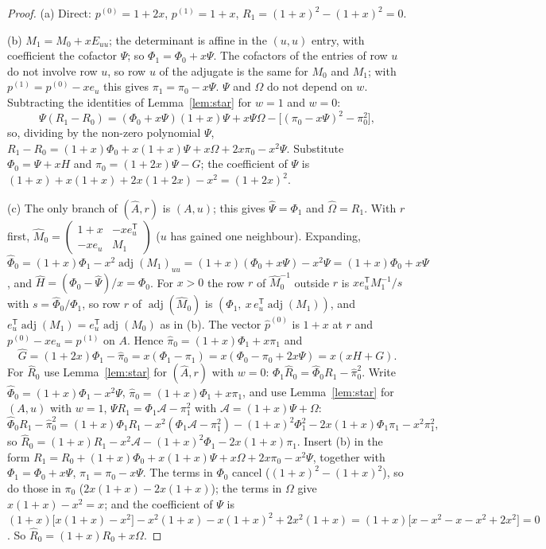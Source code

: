 \documentclass[11pt]{amsart}
\theoremstyle{definition}
\theoremstyle{remark}
\newcommand{\adj}{\operatorname{adj}}
\newcommand{\T}{\mathsf T}
\begin{document}
\begin{proof}
(a) Direct: $p^{(0)}=1+2x$, $p^{(1)}=1+x$, $R_1=(1+x)^2-(1+x)^2=0$.

(b) $M_1=M_0+xE_{uu}$; the determinant is affine in the $(u,u)$ entry, with
coefficient the cofactor $\Psi$; so $\Phi_1=\Phi_0+x\Psi$. The cofactors of
the entries of row $u$ do not involve row $u$, so row $u$ of the adjugate is
the same for $M_0$ and $M_1$; with $p^{(1)}=p^{(0)}-xe_u$ this gives
$\pi_1=\pi_0-x\Psi$. $\Psi$ and $\Omega$ do not depend on $w$. Subtracting the
identities of Lemma~\ref{lem:star} for $w=1$ and $w=0$:
\[
\Psi(R_1-R_0)=(\Phi_0+x\Psi)(1+x)\Psi+x\Psi\Omega-\bigl[(\pi_0-x\Psi)^2-\pi_0^2\bigr],
\]
so, dividing by the non-zero polynomial $\Psi$,
$R_1-R_0=(1+x)\Phi_0+x(1+x)\Psi+x\Omega+2x\pi_0-x^2\Psi$. Substitute
$\Phi_0=\Psi+xH$ and $\pi_0=(1+2x)\Psi-G$; the coefficient of $\Psi$ is
$(1+x)+x(1+x)+2x(1+2x)-x^2=(1+2x)^2$.

(c) The only branch of $(\hat A,r)$ is $(A,u)$; this gives $\hat\Psi=\Phi_1$
and $\hat\Omega=R_1$. With $r$ first,
$\hat M_0=\left(\begin{smallmatrix}1+x&-xe_u^\T\\-xe_u&M_1\end{smallmatrix}\right)$
($u$ has gained one neighbour). Expanding,
$\hat\Phi_0=(1+x)\Phi_1-x^2\adj(M_1)_{uu}=(1+x)(\Phi_0+x\Psi)-x^2\Psi=(1+x)\Phi_0+x\Psi$,
and $\hat H=(\hat\Phi_0-\hat\Psi)/x=\Phi_0$. For $x>0$ the row $r$ of
$\hat M_0^{-1}$ outside $r$ is $x e_u^\T M_1^{-1}/s$ with
$s=\hat\Phi_0/\Phi_1$, so row $r$ of $\adj(\hat M_0)$ is
$(\Phi_1,\ x\,e_u^\T\adj(M_1))$, and $e_u^\T\adj(M_1)=e_u^\T\adj(M_0)$ as in (b).
The vector $\hat p^{(0)}$ is $1+x$ at $r$ and $p^{(0)}-xe_u=p^{(1)}$ on $A$.
Hence $\hat\pi_0=(1+x)\Phi_1+x\pi_1$ and
\[
\hat G=(1+2x)\Phi_1-\hat\pi_0=x(\Phi_1-\pi_1)=x(\Phi_0-\pi_0+2x\Psi)=x(xH+G).
\]
For $\hat R_0$ use Lemma~\ref{lem:star} for $(\hat A,r)$ with $w=0$:
$\Phi_1\hat R_0=\hat\Phi_0R_1-\hat\pi_0^2$. Write
$\hat\Phi_0=(1+x)\Phi_1-x^2\Psi$, $\hat\pi_0=(1+x)\Phi_1+x\pi_1$, and use
Lemma~\ref{lem:star} for $(A,u)$ with $w=1$,
$\Psi R_1=\Phi_1\mathcal A-\pi_1^2$ with $\mathcal A=(1+x)\Psi+\Omega$:
\[
\hat\Phi_0R_1-\hat\pi_0^2=(1+x)\Phi_1R_1-x^2(\Phi_1\mathcal A-\pi_1^2)-(1+x)^2\Phi_1^2-2x(1+x)\Phi_1\pi_1-x^2\pi_1^2,
\]
so $\hat R_0=(1+x)R_1-x^2\mathcal A-(1+x)^2\Phi_1-2x(1+x)\pi_1$. Insert (b) in
the form $R_1=R_0+(1+x)\Phi_0+x(1+x)\Psi+x\Omega+2x\pi_0-x^2\Psi$, together
with $\Phi_1=\Phi_0+x\Psi$, $\pi_1=\pi_0-x\Psi$. The terms in $\Phi_0$ cancel
($(1+x)^2-(1+x)^2$), so do those in $\pi_0$ ($2x(1+x)-2x(1+x)$); the terms in
$\Omega$ give $x(1+x)-x^2=x$; and the coefficient of $\Psi$ is
$(1+x)\bigl[x(1+x)-x^2\bigr]-x^2(1+x)-x(1+x)^2+2x^2(1+x)=(1+x)\bigl[x-x^2-x-x^2+2x^2\bigr]=0$.
So $\hat R_0=(1+x)R_0+x\Omega$.


\end{proof}
\end{document}
